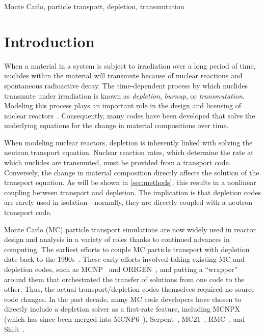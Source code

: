 \documentclass[3p,authoryear]{elsarticle}
\begin{document}
\begin{keyword}
  Monte Carlo, particle transport, depletion, transmutation
\end{keyword}

\maketitle

\section{Introduction}

When a material in a system is subject to irradiation over a long period of
time, nuclides within the material will transmute because of nuclear reactions
and spontaneous radioactive decay. The time-dependent process by which nuclides
transmute under irradiation is known as \emph{depletion}, \emph{burnup}, or
\emph{transmutation}. Modeling this process plays an important role in the
design and licensing of nuclear reactors~\citep{betzler2019ned}. Consequently,
many codes have been developed that solve the underlying equations for the
change in material compositions over time.

When modeling nuclear reactors, depletion is inherently linked with solving the
neutron transport equation. Nuclear reaction rates, which determine the rate at
which nuclides are transmuted, must be provided from a transport code.
Conversely, the change in material composition directly affects the solution of
the transport equation. As will be shown in \cref{sec:methods}, this results in
a nonlinear coupling between transport and depletion. The implication is that
depletion codes are rarely used in isolation---normally, they are directly
coupled with a neutron transport code.

Monte Carlo (MC) particle transport simulations are now widely used in reactor
design and analysis in a variety of roles thanks to continued advances in
computing. The earliest efforts to couple MC particle transport with depletion
date back to the 1990s~\citep{moore1995inel,trellue1998lanl}. These early
efforts involved taking existing MC and depletion codes, such as
MCNP~\citep{goorley2012nt} and ORIGEN~\citep{croff1983nt}, and putting a
``wrapper'' around them that orchestrated the transfer of solutions from one
code to the other. Thus, the actual transport/depletion codes themselves
required no source code changes. In the past decade, many MC code developers
have chosen to directly include a depletion solver as a first-rate feature,
including MCNPX~\citep{waters2007aip} (which has since been merged into
MCNP6~\citep{goorley2012nt}), Serpent~\citep{leppanen2015ane},
MC21~\citep{griesheimer2015ane}, RMC~\citep{wang2015ane}, and
Shift~\citep{davidson2016ane}.
\end{document}
